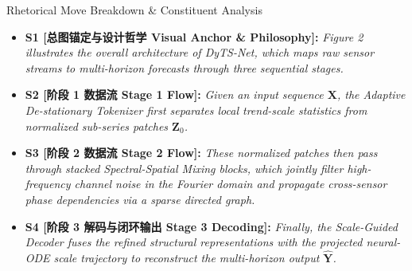 \begin{TipBox}{Rhetorical Move Breakdown \& Constituent Analysis}
\begin{itemize}[leftmargin=1.5em]
  \item \textbf{S1 [总图锚定与设计哲学 Visual Anchor \& Philosophy]:} \textit{Figure 2 illustrates the overall architecture of DyTS-Net, which maps raw sensor streams to multi-horizon forecasts through three sequential stages.}\par{}
  \item \textbf{S2 [阶段 1 数据流 Stage 1 Flow]:} \textit{Given an input sequence $\mathbf{X}$, the Adaptive De-stationary Tokenizer first separates local trend-scale statistics from normalized sub-series patches $\mathbf{Z}_0$.}\par{}
  \item \textbf{S3 [阶段 2 数据流 Stage 2 Flow]:} \textit{These normalized patches then pass through stacked Spectral-Spatial Mixing blocks, which jointly filter high-frequency channel noise in the Fourier domain and propagate cross-sensor phase dependencies via a sparse directed graph.}\par{}
  \item \textbf{S4 [阶段 3 解码与闭环输出 Stage 3 Decoding]:} \textit{Finally, the Scale-Guided Decoder fuses the refined structural representations with the projected neural-ODE scale trajectory to reconstruct the multi-horizon output $\hat{\mathbf{Y}}$.}\par{}
\end{itemize}
\end{TipBox}
\medskip

